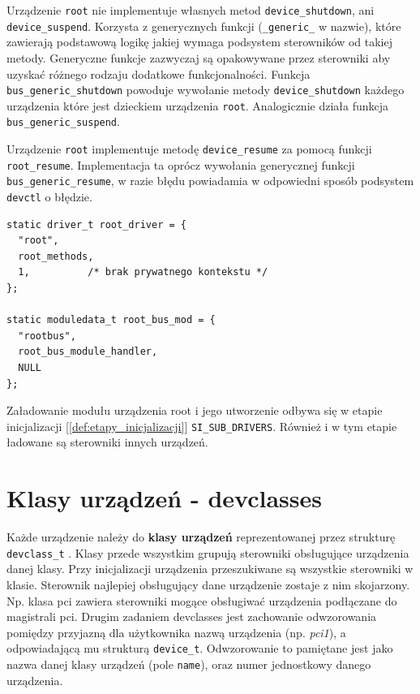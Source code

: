 \documentclass[shortabstract,inz]{iithesis}
\begin{document}
Urządzenie \texttt{root} nie implementuje własnych metod \texttt{device\_shutdown},
ani \\
\texttt{device\_suspend}. Korzysta z generycznych funkcji (\texttt{\_generic\_} w nazwie), 
które zawierają podstawową logikę jakiej wymaga podsystem sterowników od takiej metody.
Generyczne funkcje zazwyczaj są opakowywane przez sterowniki aby uzyskać różnego rodzaju
dodatkowe funkcjonalności.
\newpage
Funkcja \texttt{bus\_generic\_shutdown} powoduje wywołanie metody
\texttt{device\_shutdown} każdego urządzenia które jest dzieckiem urządzenia \texttt{root}.
Analogicznie działa funkcja \texttt{bus\_generic\_suspend}.

Urządzenie \texttt{root} implementuje metodę \texttt{device\_resume} za pomocą
funkcji \\ \texttt{root\_resume}. Implementacja ta oprócz wywołania generycznej funkcji \\
\texttt{bus\_generic\_resume}, w razie błędu powiadamia w odpowiedni sposób 
podsystem \texttt{devctl} o błędzie.

\begin{lstlisting}[caption=Definicje struktur sterownika i danych modułu]
static driver_t root_driver = {
  "root",
  root_methods,
  1,          /* brak prywatnego kontekstu */
};

static moduledata_t root_bus_mod = {
  "rootbus",
  root_bus_module_handler,
  NULL
};
\end{lstlisting}

Załadowanie modułu urządzenia root i jego utworzenie odbywa się w etapie 
inicjalizacji [\ref{def:etapy_inicjalizacji}] \texttt{SI\_SUB\_DRIVERS}. 
Również i w tym etapie ładowane są sterowniki innych urządzeń.


\section{Klasy urządzeń - devclasses} %
\label{sec:devclasses}

Każde urządzenie należy do \textbf{klasy urządzeń} reprezentowanej przez strukturę
\texttt{devclass\_t} \cite{man:devclass_9}. Klasy przede wszystkim grupują sterowniki obsługujące 
urządzenia danej klasy. Przy inicjalizacji urządzenia przeszukiwane są wszystkie sterowniki
w klasie. Sterownik najlepiej obsługujący dane urządzenie zostaje z nim skojarzony.
Np. klasa pci zawiera sterowniki mogące obsługiwać urządzenia podłączane do magistrali pci.
Drugim zadaniem devclasses jest zachowanie odwzorowania pomiędzy przyjazną dla użytkownika
nazwą urządzenia (np. \textit{pci1}), a odpowiadającą mu strukturą \texttt{device\_t}.
Odwzorowanie to pamiętane jest jako nazwa danej klasy urządzeń (pole \texttt{name}), oraz numer
jednostkowy danego urządzenia.
\end{document}
